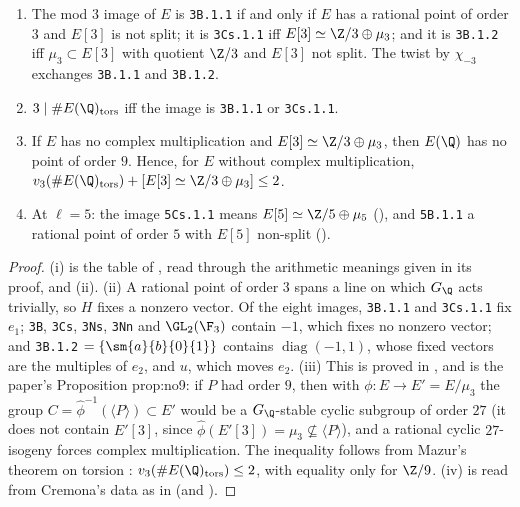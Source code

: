\begin{proposition}\label{prop:galrep:eis-labels}
\begin{enumerate}[label=(\roman*)]
\item The mod $3$ image of $E$ is \texttt{3B.1.1} if and only if $E$ has a rational point of order $3$ and $E[3]$ is not split; it is \texttt{3Cs.1.1} iff
$E[3]\simeq\Z/3\oplus\mu_3$; and it is \texttt{3B.1.2} iff $\mu_3\subset E[3]$ with quotient $\Z/3$ and $E[3]$ not split. The twist by $\chi_{-3}$ exchanges \texttt{3B.1.1} and \texttt{3B.1.2}.
\item $3\mid\#E(\Q)_{\mathrm{tors}}$ iff the image is \texttt{3B.1.1} or \texttt{3Cs.1.1}.
\item If $E$ has no complex multiplication and $E[3]\simeq\Z/3\oplus\mu_3$, then $E(\Q)$ has no point of order $9$. Hence, for $E$ without complex multiplication,
$v_3(\#E(\Q)_{\mathrm{tors}})+[E[3]\simeq\Z/3\oplus\mu_3]\le2$.
\item At $\ell=5$: the image \texttt{5Cs.1.1} means $E[5]\simeq\Z/5\oplus\mu_5$ (), and \texttt{5B.1.1} a rational point of order $5$ with $E[5]$ non-split ().
\end{enumerate}
\end{proposition}

\begin{proof}
(i) is the table of , read through the arithmetic meanings given in its proof, and (ii). (ii) A
rational point of order $3$ spans a line on which $G_\Q$ acts trivially, so $H$ fixes a nonzero vector. Of the eight images, \texttt{3B.1.1} and \texttt{3Cs.1.1} fix
$e_1$; \texttt{3B}, \texttt{3Cs}, \texttt{3Ns}, \texttt{3Nn} and $\GL_2(\F_3)$ contain $-1$, which fixes no nonzero vector; and \texttt{3B.1.2} $=\{\sm{a}{b}{0}{1}\}$ contains
$\operatorname{diag}(-1,1)$, whose fixed vectors are the multiples of $e_2$, and $u$, which moves $e_2$. (iii) This is proved in , and is the paper's
Proposition prop:no9: if $P$ had order $9$, then with $\phi\colon E\to E'=E/\mu_3$ the group $C=\hat\phi^{-1}(\langle P\rangle)\subset E'$ would be a $G_\Q$-stable cyclic subgroup
of order $27$ (it does not contain $E'[3]$, since $\hat\phi(E'[3])=\mu_3\not\subseteq\langle P\rangle$), and a rational cyclic $27$-isogeny forces complex multiplication. The
inequality follows from Mazur's theorem on torsion \cite{Mazur77}: $v_3(\#E(\Q)_{\mathrm{tors}})\le2$, with equality only for $\Z/9$. (iv) is read from Cremona's
data as in  (and ).
\end{proof}

